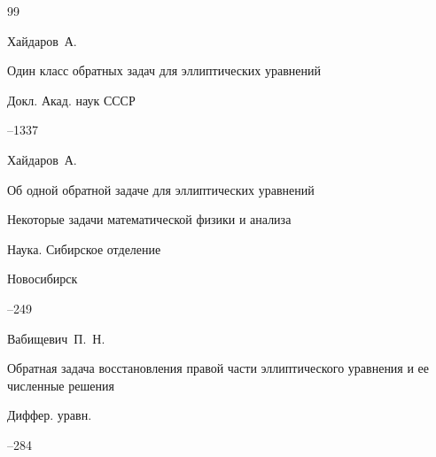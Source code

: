 \begin{thebibliography}{99}

\by Хайдаров~А.

\paper Один класс обратных задач для эллиптических уравнений 

\jour Докл. Акад. наук СССР




--1337













\by Хайдаров~А.

\paper Об одной обратной задаче для эллиптических уравнений

\inbook Некоторые задачи математической физики и анализа

\publ Наука. Сибирское отделение

\publaddr Новосибирск


--249







\by Вабищевич~П.~Н.

\paper Обратная задача восстановления правой части эллиптического уравнения и ее численные решения

\jour Диффер. уравн.




--284





\end{thebibliography}
